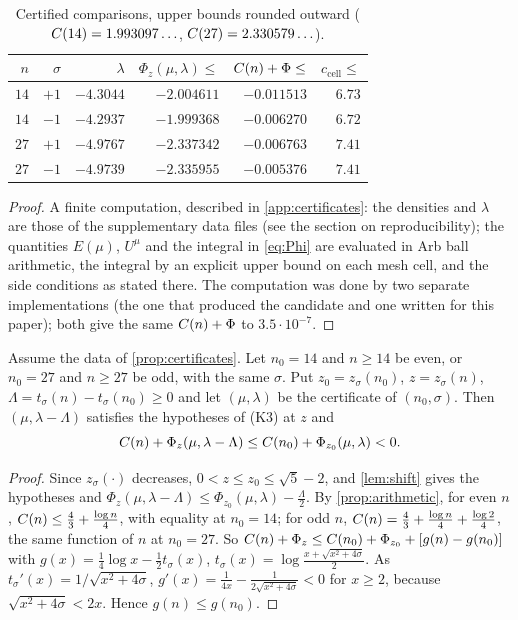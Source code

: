 \begin{table}[ht]
\centering\small
\caption{Certified comparisons, upper bounds rounded outward ($C(14)=1.993097\ldots$, $C(27)=2.330579\ldots$).}\label{tab:certificates}
\begin{tabular}{@{}rrrrrr@{}}
\toprule
$n$ & $\sigma$ & $\lambda$ & $\Phi_z(\mu,\lambda)\le$ & $C(n)+\Phi\le$ & $c_{\mathrm{cell}}\le$\\
\midrule
$14$ & $+1$ & $-4.3044$ & $-2.004611$ & $-0.011513$ & $6.73$\\
$14$ & $-1$ & $-4.2937$ & $-1.999368$ & $-0.006270$ & $6.72$\\
$27$ & $+1$ & $-4.9767$ & $-2.337342$ & $-0.006763$ & $7.41$\\
$27$ & $-1$ & $-4.9739$ & $-2.335955$ & $-0.005376$ & $7.41$\\
\bottomrule
\end{tabular}
\end{table}

\begin{proof}
A finite computation, described in \cref{app:certificates}: the densities and $\lambda$ are those of the supplementary
data files (see the section on reproducibility); the quantities $E(\mu)$, $U^\mu$ and the integral in \eqref{eq:Phi} are evaluated in
Arb ball arithmetic, the integral by an explicit upper bound on each mesh cell, and the side conditions as stated
there. The computation was done by two separate implementations (the one that produced the candidate and one written
for this paper); both give the same $C(n)+\Phi$ to $3.5\cdot10^{-7}$.
\end{proof}

\begin{proposition}\label{prop:all-traces}
Assume the data of \cref{prop:certificates}. Let $n_0=14$ and $n\ge14$ be even, or $n_0=27$ and $n\ge27$ be odd, with
the same $\sigma$. Put $z_0=z_\sigma(n_0)$, $z=z_\sigma(n)$, $\Lambda=t_\sigma(n)-t_\sigma(n_0)\ge0$ and let
$(\mu,\lambda)$ be the certificate of $(n_0,\sigma)$. Then $(\mu,\lambda-\Lambda)$ satisfies the hypotheses of \textup{(K3)}
at $z$ and
\[
C(n)+\Phi_z(\mu,\lambda-\Lambda)\le C(n_0)+\Phi_{z_0}(\mu,\lambda)<0 .
\]
\end{proposition}

\begin{proof}
Since $z_\sigma(\cdot)$ decreases, $0<z\le z_0\le\sqrt5-2$, and \cref{lem:shift} gives the hypotheses and
$\Phi_z(\mu,\lambda-\Lambda)\le\Phi_{z_0}(\mu,\lambda)-\frac\Lambda2$. By \cref{prop:arithmetic}, for even $n$,
$C(n)\le\frac43+\frac{\log n}4$, with equality at $n_0=14$; for odd $n$, $C(n)=\frac43+\frac{\log n}4+\frac{\log2}4$,
the same function of $n$ at $n_0=27$. So
$C(n)+\Phi_z\le C(n_0)+\Phi_{z_0}+[g(n)-g(n_0)]$ with $g(x)=\frac14\log x-\frac12t_\sigma(x)$,
$t_\sigma(x)=\log\frac{x+\sqrt{x^2+4\sigma}}2$. As $t_\sigma'(x)=1/\sqrt{x^2+4\sigma}$,
$g'(x)=\frac1{4x}-\frac1{2\sqrt{x^2+4\sigma}}<0$ for $x\ge2$, because $\sqrt{x^2+4\sigma}<2x$. Hence
$g(n)\le g(n_0)$.
\end{proof}
